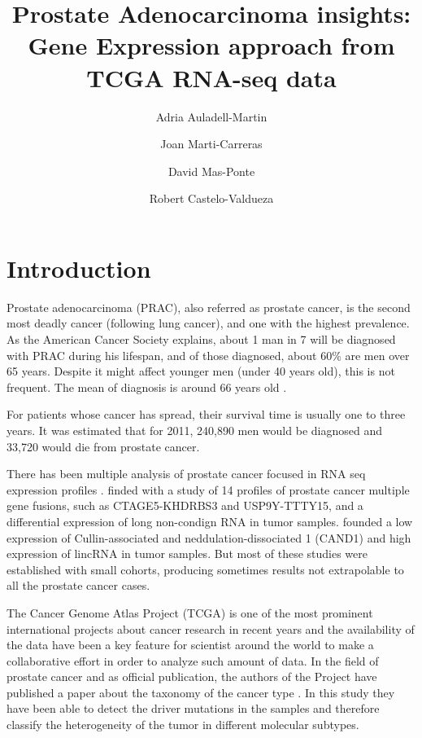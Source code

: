 \documentclass[9pt,twocolumn,twoside]{gsajnl}
\title{Prostate Adenocarcinoma insights: Gene Expression approach from TCGA RNA-seq data}
\author[$\ast$,$\dagger$]{Adria Auladell-Martin}
\author[$\ast$,$\dagger$]{Joan Marti-Carreras}
\author[$\ast$,$\dagger$]{David Mas-Ponte}
\author[$\ast$,1]{Robert Castelo-Valdueza}
\affil[$\ast$]{M.Sc. in Bioinformatics at Department of Experimental and Health Sciences (CEXS), Universitat Pompeu Fabra}
\affil[$\dagger$]{Authors Contributed Equally to this work}
\begin{document}
\maketitle
\thispagestyle{firststyle}
\marginmark
\firstpagefootnote
{}
\vspace{-11pt}%

\section*{Introduction}

Prostate adenocarcinoma (PRAC), also referred as prostate cancer, is  the second most deadly cancer (following lung cancer), and one with the highest prevalence. As the American Cancer Society explains, about 1 man in 7 will be diagnosed with PRAC during his lifespan, and of those diagnosed, about 60\% are men over 65 years. Despite it might affect younger men (under 40 years old), this is not frequent. The mean of diagnosis is around 66 years old \citep{prostatestatistics}.

For patients whose cancer has spread, their survival time is usually one to three years. It was estimated that for 2011, 240,890 men would be diagnosed and 33,720 would die from prostate cancer. 

There has been multiple analysis of prostate cancer focused in RNA seq expression profiles \citep{rnaseq1,rnaseq2,zhai,rnaseq3,rnaseq4}. \cite{rnaseq1} finded with a study of 14 profiles of prostate cancer multiple gene fusions, such as CTAGE5-KHDRBS3 and USP9Y-TTTY15, and a differential expression of long non-condign RNA in tumor samples. \cite{zhai} founded a low expression of Cullin-associated and neddulation-dissociated 1 (CAND1) and high expression of lincRNA in tumor samples.  But most of these studies were established with small cohorts, producing sometimes results not extrapolable to all the prostate cancer cases.

 The Cancer Genome Atlas Project (TCGA) \citep{tgca} is one of the most prominent international projects about cancer research in recent years and the availability of the data have been a key feature for scientist around the world to make a collaborative effort in order to analyze such amount of data. In the field of prostate cancer and as official publication, the authors of the Project have published a paper about the taxonomy of the cancer type \citep{Abeshouse2015}. In this study they have been able to detect the driver mutations in the samples and therefore classify the heterogeneity of the tumor in different molecular subtypes. 
 
\end{document}

